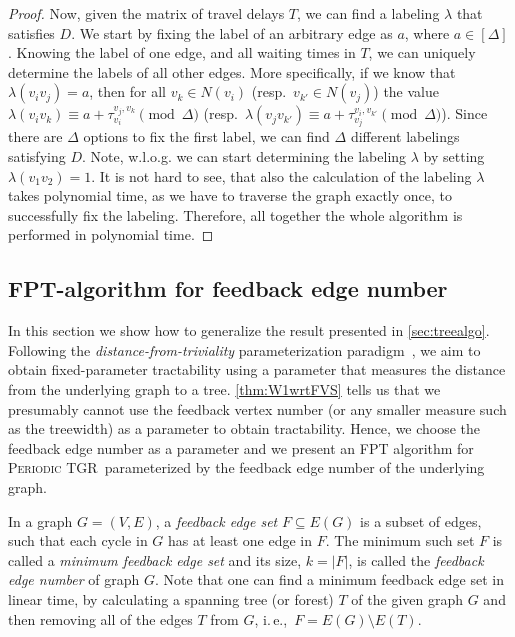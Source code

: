 \documentclass[a4paper,UKenglish,cleveref, autoref, thm-restate, anonymous]{lipics-v2021}
\newcommand{\ie}{i.\,e.,\ }
\newcommand{\deltaExact}{\textsc{Periodic TGR}}
\begin{document}
\begin{proof}
    Now, given the matrix of travel delays $T$, we can find a labeling $\lambda$ that satisfies $D$.
    We start by fixing the label of an arbitrary edge as $a$, where $a \in [\Delta]$.
    Knowing the label of one edge, and all waiting times in $T$, we can uniquely determine the labels of all other edges.
    More specifically, if we know that $\lambda(v_i v_j) = a$, then for all $v_k \in N(v_i)$ (resp.~$v_{k'} \in N(v_j)$)
    the value $\lambda(v_iv_k) \equiv a + \tau_{v_i}^{v_j,v_k} \pmod \Delta $ (resp.~$\lambda(v_j v_{k'}) \equiv a + \tau_{v_j}^{v_i,v_{k'}} \pmod \Delta $).
    Since there are $\Delta$ options to fix the first label, we can find $\Delta$ different labelings satisfying $D$.
    Note, w.l.o.g. we can start determining the labeling $\lambda$ by setting $\lambda(v_1v_2) = 1$.
    It is not hard to see, that also the calculation of the labeling $\lambda$ takes polynomial time, as we have to traverse the graph exactly once, to successfully fix the labeling. Therefore, all together the whole algorithm is performed in polynomial time.
\end{proof}






\subsection{FPT-algorithm for feedback edge number}\label{sec:FPT}






In this section we show how to generalize the result presented in \cref{sec:treealgo}. Following the \emph{distance-from-triviality} parameterization paradigm~\cite{FJR13,GHN04}, we aim to obtain fixed-parameter tractability using a parameter that measures the distance from the underlying graph to a tree. \cref{thm:W1wrtFVS} tells us that we presumably cannot use the feedback vertex number (or any smaller measure such as the treewidth) as a parameter to obtain tractability. Hence, we choose the feedback edge number as a parameter and we present an FPT algorithm for \deltaExact\ parameterized by the feedback edge number of the underlying graph.

In a graph $G=(V,E)$, a \emph{feedback edge set} $F \subseteq E(G)$ is a subset of edges, such that each cycle in $G$ has at least one edge in $F$.
The minimum such set $F$ is called a  \emph{minimum feedback edge set} and its size, $k = |F|$, is called the \emph{feedback edge number} of graph $G$.
Note that one can find a minimum feedback edge set in linear time, by calculating a spanning tree (or forest) $T$ of the given graph $G$ and then removing all of the edges $T$ from $G$, \ie $F = E(G) \setminus E(T)$.
\end{document}
